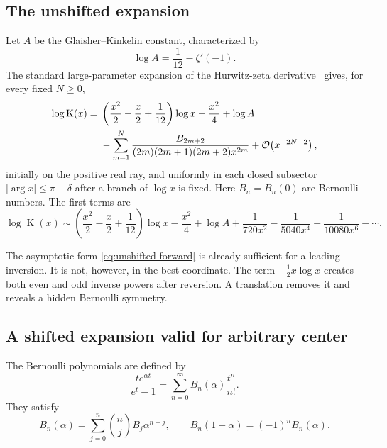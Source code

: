 \documentclass[11pt,oneside]{article}
\theoremstyle{plain}
\theoremstyle{definition}
\theoremstyle{remark}
\newcommand{\Kfun}{\operatorname{K}}
\newcommand{\BigO}{\mathcal{O}}
\begin{document}
\subsection{The unshifted expansion}

Let \(A\) be the Glaisher--Kinkelin constant, characterized by
\begin{equation}
 \log A=\frac1{12}-\zeta'(-1).
 \label{eq:glaisher}
\end{equation}
The standard large-parameter expansion of the Hurwitz-zeta derivative~\cite{DLMF25,Nemes2017} gives,
for every fixed \(N\ge0\),
\begin{align}
 \log\Kfun(x)
 ={}&\left(\frac{x^2}{2}-\frac{x}{2}+\frac1{12}\right)\log x
     -\frac{x^2}{4}+\log A
 \notag\\
 &-\sum_{m=1}^{N}
   \frac{B_{2m+2}}{(2m)(2m+1)(2m+2)x^{2m}}
 +\BigO\!\left(x^{-2N-2}\right),
 \label{eq:unshifted-forward}
\end{align}
initially on the positive real ray, and uniformly in each closed subsector
\(|\arg x|\le\pi-\delta\) after a branch of \(\log x\) is fixed.  Here
\(B_n=B_n(0)\) are Bernoulli numbers.  The first terms are
\begin{equation}
 \log\Kfun(x)
 \sim \left(\frac{x^2}{2}-\frac{x}{2}+\frac1{12}\right)\log x
 -\frac{x^2}{4}+\log A
 +\frac1{720x^2}-\frac1{5040x^4}
 +\frac1{10080x^6}-\cdots.
 \label{eq:unshifted-first}
\end{equation}

The asymptotic form \eqref{eq:unshifted-forward} is already sufficient for a
leading inversion.  It is not, however, in the best coordinate.  The term
\(-\tfrac12x\log x\) creates both even and odd inverse powers after reversion.
A translation removes it and reveals a hidden Bernoulli symmetry.

\subsection{A shifted expansion valid for arbitrary center}

The Bernoulli polynomials are defined by
\begin{equation}
 \frac{te^{\alpha t}}{e^t-1}
 =\sum_{n=0}^{\infty}B_n(\alpha)\frac{t^n}{n!}.
 \label{eq:Bernoulli-polynomials}
\end{equation}
They satisfy
\begin{equation}
 B_n(\alpha)=\sum_{j=0}^{n}\binom{n}{j}B_j\alpha^{n-j},
 \qquad
 B_n(1-\alpha)=(-1)^nB_n(\alpha).
 \label{eq:Bernoulli-identities}
\end{equation}
\end{document}
